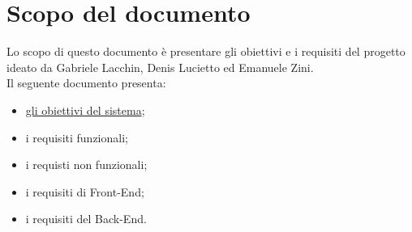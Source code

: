 \section*{Scopo del documento}
Lo scopo di questo documento è presentare gli obiettivi e i requisiti del progetto \nome ideato da Gabriele Lacchin, Denis Lucietto ed Emanuele Zini.\\
Il seguente documento presenta:
\begin{itemize}
    \item \hyperref[sec:ObiettiviProgetto]{gli obiettivi del sistema};
    \item i requisiti funzionali;
    \item i requisti non funzionali;
    \item i requisiti di Front-End;
    \item i requisiti del Back-End.
\end{itemize}